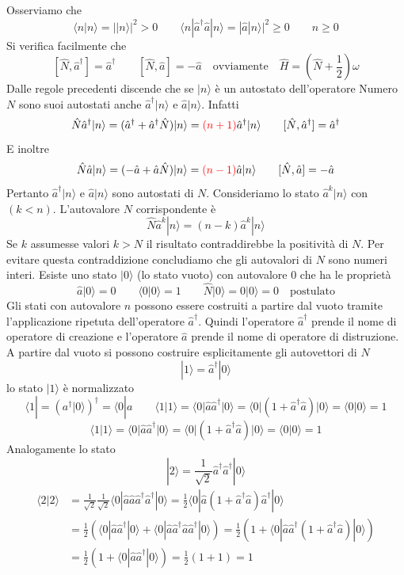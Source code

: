 Osserviamo che
$$
\langle n | n \rangle = | |n\rangle |^2 > 0 \qquad \langle n | \hat{a}^\dagger \hat{a} | n \rangle = |\hat{a}|n\rangle|^2 \ge 0 \qquad n \ge 0
$$
Si verifica facilmente che
$$
[\hat{N}, \hat{a}^\dagger] = \hat{a}^\dagger \qquad [\hat{N}, \hat{a}] = -\hat{a} \quad \text{ovviamente} \quad \hat{H} = \left( \hat{N} + \frac{1}{2} \right) \omega
$$
Dalle regole precedenti discende che se $|n\rangle$ è un autostato dell'operatore Numero $N$ sono suoi autostati anche $\hat{a}^\dagger|n\rangle$ e $\hat{a}|n\rangle$. Infatti 
$$
\hat{N}\hat{a}^\dagger |n\rangle = (\hat{a}^\dagger + \hat{a}^\dagger \hat{N}) |n\rangle = \textcolor{red}{(n+1)} \hat{a}^\dagger |n\rangle \qquad [\hat{N}, \hat{a}^\dagger] = \hat{a}^\dagger
$$
E inoltre 
$$
\hat{N}\hat{a} |n\rangle = (-\hat{a} + \hat{a} \hat{N}) |n\rangle = \textcolor{red}{(n-1)} \hat{a} |n\rangle \qquad [\hat{N}, \hat{a}] = -\hat{a}
$$
Pertanto $\hat{a}^\dagger|n\rangle$ e $\hat{a}|n\rangle$ sono autostati di $N$. Consideriamo lo stato $\hat{a}^k|n\rangle$ con $(k<n)$. L'autovalore $N$ corrispondente è
$$
\hat{N}\hat{a}^k |n\rangle = (n-k) \hat{a}^k |n\rangle
$$
Se $k$ assumesse valori $k>N$ il risultato contraddirebbe la positività di $N$. Per evitare questa contraddizione concludiamo che gli autovalori di $N$ sono numeri interi. Esiste uno stato $|0\rangle$ (lo stato vuoto) con autovalore $0$ che ha le proprietà
$$
\hat{a} |0\rangle = 0 \qquad \langle 0 | 0 \rangle = 1 \qquad \hat{N} |0\rangle = 0 |0\rangle = 0 \quad \text{postulato}
$$
Gli stati con autovalore $n$ possono essere costruiti a partire dal vuoto tramite l'applicazione ripetuta dell'operatore $\hat{a}^\dagger$. Quindi l'operatore $\hat{a}^\dagger$ prende il nome di operatore di creazione e l'operatore $\hat{a}$ prende il nome di operatore di distruzione. A partire dal vuoto si possono costruire esplicitamente gli autovettori di $N$
$$
|1\rangle = \hat{a}^\dagger |0\rangle
$$
lo stato $|1\rangle$ è normalizzato
$$
\langle1|=\left(a^\dagger|0\rangle\right)^\dagger=\langle0|a\qquad\langle 1 | 1 \rangle = \langle 0 | \hat{a} \hat{a}^\dagger | 0 \rangle = \langle 0 | (1 + \hat{a}^\dagger \hat{a}) | 0 \rangle = \langle 0 | 0 \rangle = 1
$$
$$
\langle 1 | 1 \rangle = \langle 0 | \hat{a} \hat{a}^\dagger | 0 \rangle = \langle 0 | (1 + \hat{a}^\dagger \hat{a}) | 0 \rangle = \langle 0 | 0 \rangle = 1
$$
Analogamente lo stato 
$$
|2\rangle = \frac{1}{\sqrt{2}} \hat{a}^\dagger \hat{a}^\dagger |0\rangle
$$
\begin{align*}
\langle 2 | 2 \rangle &= \frac{1}{\sqrt{2}}\frac{1}{\sqrt{2}} \langle 0 | \hat{a}\hat{a} \hat{a}^\dagger \hat{a}^\dagger | 0 \rangle = \frac{1}{2} \langle 0 | \hat{a}(1 + \hat{a}^\dagger \hat{a}) \hat{a}^\dagger | 0 \rangle\\
&= \frac{1}{2} ( \langle 0 | \hat{a}\hat{a}^\dagger | 0 \rangle + \langle 0 | \hat{a}\hat{a}^\dagger \hat{a} \hat{a}^\dagger | 0 \rangle ) = \frac{1}{2} ( 1 + \langle 0 | \hat{a}\hat{a}^\dagger (1 + \hat{a}^\dagger \hat{a}) | 0 \rangle ) \\
&= \frac{1}{2} ( 1 + \langle 0 | \hat{a}\hat{a}^\dagger | 0 \rangle ) = \frac{1}{2} (1 + 1) = 1
\end{align*}
